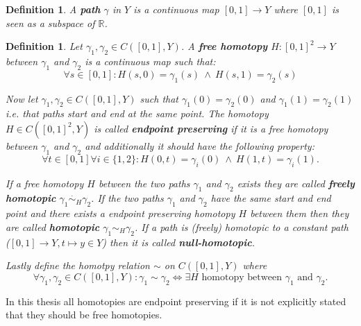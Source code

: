 \documentclass[a4paper, 11pt, twoside]{article}
\newcommand{\R}[0]{\mathbb{R}}
\theoremstyle{break}
\theoremstyle{break}
\newtheorem{defin}[thm]{Definition}
\begin{document}
\begin{defin}
  A \textbf{path} $\gamma$ in $Y$ is a continuous map $[0,1] \to Y$ where $[0,1]$ is seen as a subspace of $\R$.
\end{defin}

\begin{defin}
  Let $\gamma_1, \gamma_2 \in C([0, 1], Y)$. A \textbf{free homotopy} $H\colon [0,1]^2 \to Y$ between $\gamma_1$ and $\gamma_2$ is a continuous map such that:
  \begin{equation*}
    \forall s \in [0,1]: H(s, 0) = \gamma_1(s) \: \land \: H(s, 1) = \gamma_2(s)
  \end{equation*}

  Now let $\gamma_1, \gamma_2 \in C([0, 1], Y)$ such that $\gamma_1(0) = \gamma_2(0)$ and $\gamma_1(1) = \gamma_2(1)$ i.e. that paths start and end at the same point.
  The homotopy $H \in C([0,1]^2, Y)$ is called \textbf{endpoint preserving} if it is a free homotopy between $\gamma_1$ and $\gamma_2$ and additionally it should have the following property: 
  \begin{equation*}
    \forall t\in[0,1]\forall i\in \{1,2\}: H(0, t) = \gamma_i(0) \: \land \: H(1, t) = \gamma_i(1).
  \end{equation*}

  If a free homotopy $H$ between the two paths $\gamma_1$ and $\gamma_2$ exists they are called \textbf{freely homotopic} $\gamma_1 \overset{\cdot}{\sim}_H \gamma_2$.
  If the two paths $\gamma_1$ and $\gamma_2$ have the same start and end point and there exists a endpoint preserving homotopy $H$ between them then they are called 
  \textbf{homotopic} $\gamma_1 \sim_H \gamma_2$. If a path is (freely) homotopic to a constant path ($[0,1] \to Y, t \mapsto y \in Y$) then it is called \textbf{null-homotopic}.

  Lastly define the homotpy relation $\sim$ on $C([0,1], Y)$ where 
  \begin{equation*}
    \forall\gamma_1, \gamma_2 \in C([0,1], Y)\colon \gamma_1 \sim \gamma_2 \iff \exists H \text{ homotopy between } \gamma_1 \text{ and } \gamma_2.
  \end{equation*}
\end{defin}

In this thesis all homotopies are endpoint preserving if it is not explicitly stated that they should be free homotopies.
\end{document}
